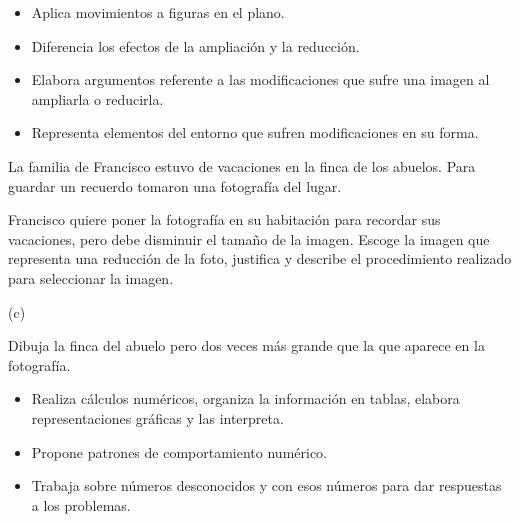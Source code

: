 \begin{itemize}
  \item Aplica movimientos a figuras en el plano.
  \item Diferencia los efectos de la ampliación y la reducción.
  \item Elabora argumentos referente a las modificaciones que sufre una imagen al ampliarla o reducirla.
  \item Representa elementos del entorno que sufren modificaciones en su forma.
\end{itemize}

\ejemplo

La familia de Francisco estuvo de vacaciones en la finca de los abuelos. Para guardar un recuerdo tomaron una fotografía del lugar.


Francisco quiere poner la fotografía en su habitación para recordar sus vacaciones, pero debe disminuir el tamaño de la imagen. Escoge la imagen que representa una reducción de la foto, justifica y describe el procedimiento realizado para seleccionar la imagen.




(c)

Dibuja la finca del abuelo pero dos veces más grande que la que aparece en la fotografía.



\evidencias

\begin{itemize}
  \item Realiza cálculos numéricos, organiza la información en tablas, elabora representaciones gráficas y las interpreta.
  \item Propone patrones de comportamiento numérico.
  \item Trabaja sobre números desconocidos y con esos números para dar respuestas a los problemas.
\end{itemize}

